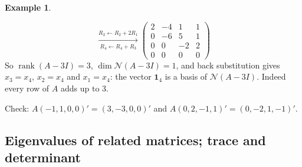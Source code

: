 \documentclass[12pt]{article}
\newcommand{\one}{\mathbf 1}
\DeclareMathOperator{\rank}{rank}
\theoremstyle{definition}
\newtheorem{example}[theorem]{Example}
\begin{document}
\begin{example}
\begin{itemize}
\[\xrightarrow[R_4\leftarrow R_4+R_3]{R_2\leftarrow R_2+2R_1}
\begin{pmatrix}2&-4&1&1\\0&-6&5&1\\0&0&-2&2\\0&0&0&0\end{pmatrix}
\]
So \(\rank(A-3I)=3\), \(\dim\mathcal N(A-3I)=1\), and back substitution gives \(x_3=x_4\), \(x_2=x_4\) and
\(x_1=x_4\): the vector \(\one_4\) is a basis of \(\mathcal N(A-3I)\). Indeed every row of \(A\) adds up to \(3\).
\end{itemize}
Check: \(A(-1,1,0,0)'=(3,-3,0,0)'\) and \(A(0,2,-1,1)'=(0,-2,1,-1)'\).
\end{example}

\subsection*{Eigenvalues of related matrices; trace and determinant}
\end{document}
